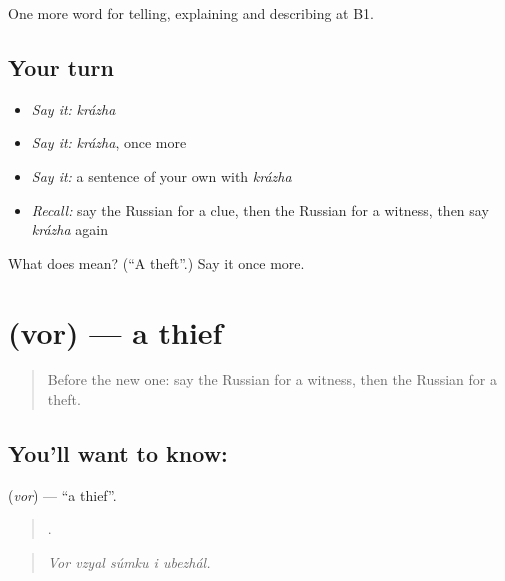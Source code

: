 \begin{grammarlens}[title={What you've built}]
One more word for telling, explaining and describing at B1.
\end{grammarlens}

\subsection*{Your turn}
\begin{itemize}
\raggedright
  \item \emph{Say it:} \emph{krázha}
  \item \emph{Say it:} \emph{krázha}, once more
  \item \emph{Say it:} a sentence of your own with \emph{krázha}
  \item \emph{Recall:} say the Russian for a clue, then the Russian for a witness, then say \emph{krázha} again
\end{itemize}

\begin{tcolorbox}[breakable,colback=teal!4,colframe=teal!35!black,title={Before you move on}]
What does  mean? (\textquotedblleft{}A theft\textquotedblright{}.) Say it once more.
\end{tcolorbox}
\section[\texorpdfstring{\ru{вор} (vor)}{вор (vor)}]{ (vor) — a thief}

\label{lesson:RU-C288-vor}



\begin{quote}
Before the new one: say the Russian for a witness, then the Russian for a theft.
\end{quote}

\subsection*{You'll want to know: }
\textbf{} (\emph{vor}) — \textquotedblleft{}a thief\textquotedblright{}.

\begin{quote}
    .
\end{quote}

\begin{quote}
\emph{Vor vzyal súmku i ubezhál.}
\end{quote}

